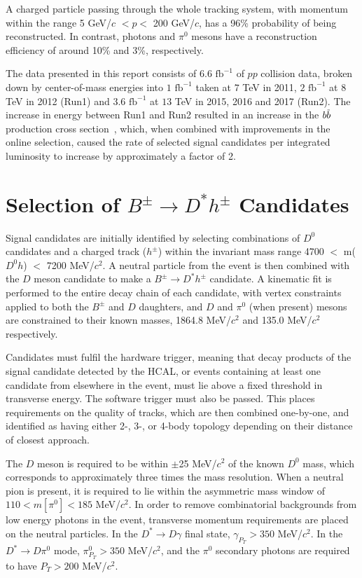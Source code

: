 \documentclass[oneside,12pt]{article}
\newcommand{\overbar}[1]{\mkern 1.5mu\overline{\mkern-1.5mu#1\mkern-1.5mu}\mkern
1.5mu}
\begin{document}
A charged particle passing through the whole tracking system, with momentum
within the range 5 GeV/$c$ $< p <$ 200 GeV/$c$, has a 96\% probability of being
reconstructed. In contrast, photons and $\pi^0$ mesons have a reconstruction
efficiency of around 10\% and 3\%, respectively.

The data presented in this report consists of $6.6$ $\text{fb}^{-1}$ of $pp$
collision data, broken down by center-of-mass energies into $1$ $\text{fb}^{-1}$ taken at $7$ TeV in 2011, $2$
$\text{fb}^{-1}$ at $8$ TeV in 2012 (Run1) and $3.6$ $\text{fb}^{-1}$ at $13$
TeV in 2015, 2016 and 2017 (Run2). The increase in energy between Run1 and Run2
resulted in an increase in the $b\overbar{b}$ production cross
section~\cite{PDG2018}, which, when combined with improvements in the online
selection, caused the rate of selected signal candidates per integrated
luminosity to increase by approximately a factor of 2.

\vspace{-3mm}
\section{Selection of $B^{\pm}\rightarrow D^*h^{\pm}$ Candidates} \label{sec:selections}

Signal candidates are initially identified by selecting combinations of $D^0$
candidates and a charged track ($h^{\pm}$) within the invariant mass range 4700
$<$ m($D^0h$) $<$ 7200 MeV/$c^2$. A neutral particle from the event is then
combined with the $D$ meson candidate to make a $B^{\pm}\rightarrow D^*h^{\pm}$
candidate. A kinematic fit is performed to the entire decay chain of each
candidate, with vertex constraints applied to both the $B^{\pm}$ and $D$
daughters, and $D$ and $\pi^0$ (when present) mesons are constrained to their
known masses, 1864.8 MeV/$c^2$ and 135.0 MeV/$c^2$ respectively.

Candidates must fulfil the hardware trigger, meaning that decay products of the
signal candidate detected by the HCAL, or events containing at least one
candidate from elsewhere in the event, must lie above a fixed threshold in
transverse energy.  The software trigger must also be passed. This places
requirements on the quality of tracks, which are then combined one-by-one, and
identified as having either 2-, 3-, or 4-body topology depending on their
distance of closest approach. 

The $D$ meson is required to be within $\pm$25 MeV/$c^2$ of the known $D^0$
mass, which corresponds to approximately three times the mass resolution.  When
a neutral pion is present, it is required to lie within the asymmetric mass
window of $110 < m[\pi^0] < 185$ MeV/$c^2$. In order to remove combinatorial
backgrounds from low energy photons in the event, transverse momentum
requirements are placed on the neutral particles. In the $D^*\rightarrow
D\gamma$ final state, $\gamma_{P_T}>350$ MeV/$c^2$. In the $D^*\rightarrow
D\pi^0$ mode, $\pi^0_{P_T}>350$ MeV/$c^2$, and the $\pi^0$ secondary photons are
required to have $P_T>200$ MeV/$c^2$.
\end{document}
